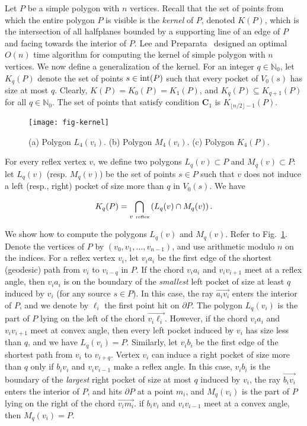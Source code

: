 \documentclass[12pt]{article}
\newcommand{\floor}[1]{{\lfloor #1 \rfloor}}
\begin{document}
Let $P$ be a simple polygon with $n$ vertices. Recall that the set of points from which the entire polygon $P$ is visible is the \emph{kernel} of $P$, denoted $K(P)$, which is the intersection of all halfplanes bounded by a supporting line of an edge of $P$ and facing towards the interior of $P$. Lee and Preparata~\cite{LeePreparata79} designed an optimal $O(n)$ time algorithm for computing the kernel of simple polygon with $n$ vertices. We now define a generalization of the kernel. For an integer $q\in \mathbb{N}_0$, let $K_q(P)$ denote the set of points $s\in {\rm int}(P)$
such that every pocket of $V_0(s)$ has size at most $q$. Clearly, $K(P)=K_0(P)=K_1(P)$, and $K_q(P)\subseteq K_{q+1}(P)$ for all $q\in \mathbb{N}_0$. The set of points that satisfy condition $\mathbf{C}_1$ is $K_{\floor{n/2}-1}(P)$.

\begin{figure}[htp]
  \centering
  \texttt{[image: fig-kernel]}
  \caption{\label{fig:kernel}
(a) Polygon $L_4(v_i)$.
(b) Polygon $M_4(v_i)$.
(c) Polygon $K_4(P)$.}
\end{figure}

For every reflex vertex $v$, we define two polygons $L_q(v)\subset P$ and $M_q(v)\subset P$:
let $L_q(v)$ (resp. $M_q(v)$) be the set of points $s\in P$ such that $v$ does not induce a left (resp., right) pocket of size more than $q$ in $V_0(s)$. We have

$$K_q(P) = \bigcap_{v \mbox{\ \tiny\rm reflex}} \left(L_q(v) \cap M_q(v) \right).$$

We show how to compute the polygons $L_q(v)$ and $M_q(v)$. Refer to Fig.~\ref{fig:kernel}. Denote the vertices of $P$ by $(v_0,v_1,\ldots , v_{n-1})$, and use arithmetic modulo $n$ on the indices.
For a reflex vertex $v_i$, let $v_ia_i$ be the first edge of the shortest (geodesic) path from $v_i$ to $v_{i-q}$ in $P$. If the chord $v_ia_i$ and $v_iv_{i+1}$ meet at a reflex angle, then $v_ia_i$ is on the boundary of the \emph{smallest} left pocket of size at least $q$ induced by $v_i$ (for any source $s\in P$). In this case, the ray $\overrightarrow{a_iv_i}$ enters the interior of $P$, and we denote by $\ell_i$ the first point hit on $\partial P$. The polygon $L_q(v_i)$ is the part of $P$ lying on the left of the chord $\overrightarrow{v_i\ell_i}$. However, if the chord $v_ia_i$ and $v_iv_{i+1}$ meet at convex angle, then every left pocket induced by $v_i$ has size less than $q$, and we have $L_q(v_i)=P$.
Similarly, let $v_ib_i$ be the first edge of the shortest path from $v_i$ to $v_{i+q}$. Vertex $v_i$ can induce a right pocket of size more than $q$ only if $b_iv_i$ and $v_iv_{i-1}$ make a reflex angle. In this case, $v_ib_i$ is the boundary of the \emph{largest} right pocket of size at most $q$ induced by $v_i$, the ray $\overrightarrow{b_iv_i}$  enters the interior of $P$, and hits $\partial P$ at a point $m_i$, and $M_q(v_i)$ is the part of $P$ lying on the right of the chord $\overrightarrow{v_im_i}$. if $b_iv_i$ and $v_iv_{i-1}$ meet at a convex angle, then $M_q(v_i)=P$.
\end{document}
